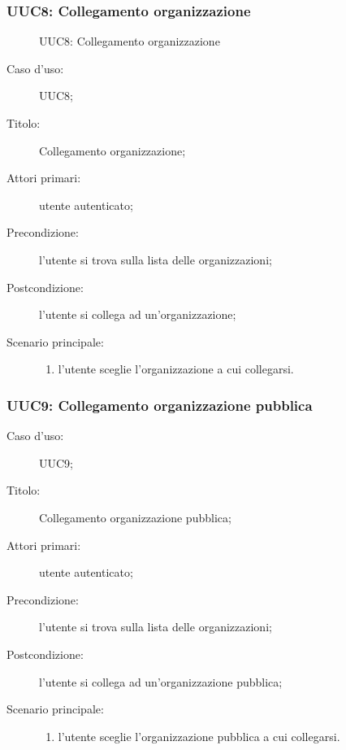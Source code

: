 \documentclass[../../../analisi-dei-requisiti.tex]{subfiles}
\begin{document}
\subsubsection{UUC8: Collegamento organizzazione}%
\label{subs:UUC8}

\begin{figure}[H]
  \centering
  \caption{UUC8: Collegamento organizzazione}%
  \label{fig:UUC8}
\end{figure}



\begin{description}
  \item[Caso d'uso:] UUC8;
  \item[Titolo:] Collegamento organizzazione;
  \item[Attori primari:] utente autenticato;
  \item[Precondizione:] l'utente si trova sulla lista delle organizzazioni;
  \item[Postcondizione:] l'utente si collega ad un'organizzazione;
  \item[Scenario principale:]
        \begin{enumerate}
          \item l'utente sceglie l'organizzazione a cui collegarsi.
        \end{enumerate}
\end{description}

\subsubsection{UUC9: Collegamento organizzazione pubblica}%
\label{subs:UUC9}

\begin{description}
  \item[Caso d'uso:] UUC9;
  \item[Titolo:] Collegamento organizzazione pubblica;
  \item[Attori primari:] utente autenticato;
  \item[Precondizione:] l'utente si trova sulla lista delle organizzazioni;
  \item[Postcondizione:] l'utente si collega ad un'organizzazione pubblica;
  \item[Scenario principale:]
        \begin{enumerate}
          \item l'utente sceglie l'organizzazione pubblica a cui collegarsi.
        \end{enumerate}
\end{description}
\end{document}

